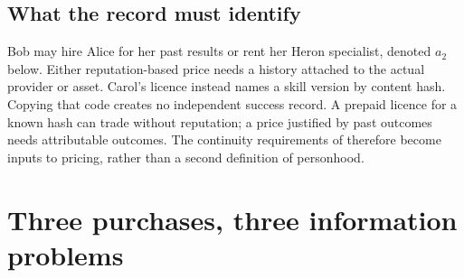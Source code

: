 \documentclass[11pt,a4paper]{article}
\theoremstyle{definition}
\theoremstyle{definition}
\theoremstyle{remark}
\begin{document}
\subsection{What the record must identify}
Bob may hire Alice for her past results or rent her Heron specialist, denoted
$a_2$ below. Either reputation-based price needs a history attached to the
actual provider or asset. Carol's licence instead names a skill version by
content hash. Copying that code creates no independent success record.
A prepaid licence for a known hash can trade without reputation; a price
justified by past outcomes needs attributable outcomes. The continuity
requirements of  therefore become inputs
to pricing, rather than a second definition of personhood.

\pdexercisepointer{\ref{ex:he-clone-word}}{\ref{ex:he-no-identity-market}}{\pageref{ex:he-clone-word}}
\section{Three purchases, three information problems}\label{sec:three-sides}
\end{document}
